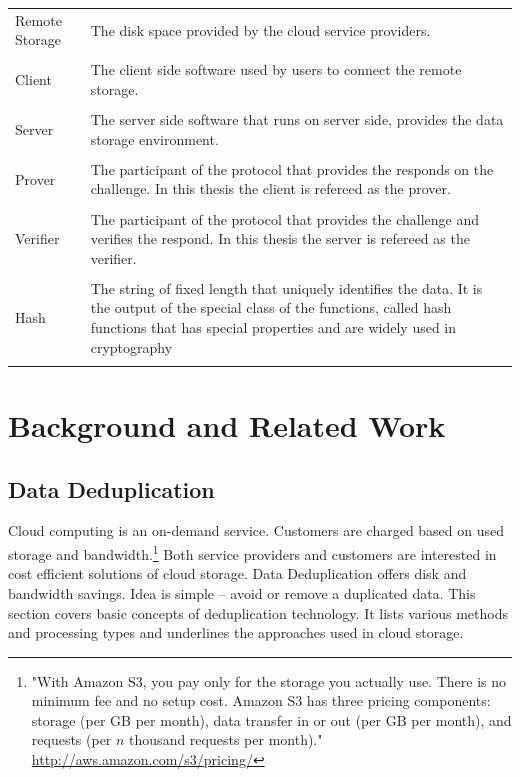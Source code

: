 \documentclass[12pt]{article}
\begin{document}
\begin{tabular}{L{4cm}L{12cm}}
Remote Storage & The disk space provided by the cloud service providers.\\\\
Client&The client side software used by users to connect the remote storage.\\\\
Server&The server side software that runs on server side, provides the data storage environment.\\\\
Prover&The participant of the protocol that provides the responds on the challenge. In this thesis the client is refereed as the prover.\\\\
Verifier&The participant of the protocol that provides the challenge and verifies the respond. In this thesis the server is refereed as the verifier.\\\\
Hash& The string of fixed length that uniquely identifies the data. It is the output of the special class of the functions, called hash functions that has special properties and are widely used in cryptography\\\\

\end{tabular}


\pagebreak
\section{Background and Related Work}
\label{sec:3}
\subsection{Data Deduplication}
\label{sub:Deduplication}
Cloud computing is an on-demand service. Customers are charged based on used storage and bandwidth.\footnote{"With Amazon S3, you pay only for the storage you actually use. There is no minimum fee and no setup cost. Amazon S3 has three pricing components: storage (per GB per month), data transfer in or out (per GB per month), and requests (per $n$ thousand requests per month)." \url{http://aws.amazon.com/s3/pricing/}} Both service providers and customers are interested in cost efficient solutions of cloud storage. Data Deduplication offers disk and bandwidth savings. Idea is simple -- avoid or remove a duplicated data. 
This section covers basic concepts of deduplication technology. It lists various methods and processing types and underlines the approaches used in cloud storage.
\end{document}
